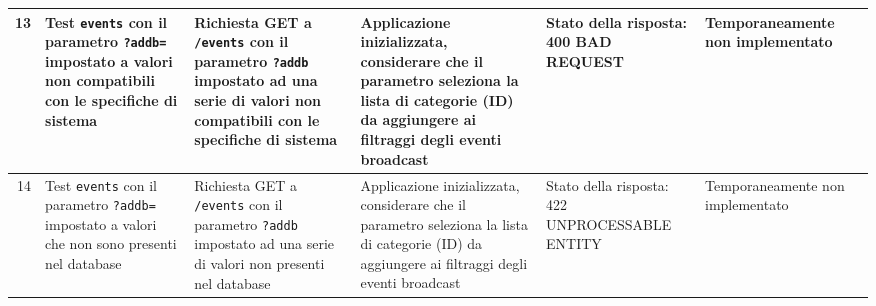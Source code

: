 \documentclass{article}
\begin{document}
\begin{table}[H]
\begin{tabularx}{\textwidth}{| r | X | X | X | X | X | X |}
        \hline
        13 & Test \texttt{events} con il parametro \texttt{?addb=} impostato a valori non compatibili con le specifiche di sistema & Richiesta GET a \texttt{/events} con il parametro \texttt{?addb} impostato ad una serie di valori non compatibili con le specifiche di sistema & Applicazione inizializzata, considerare che il parametro seleziona la lista di categorie (ID) da aggiungere ai filtraggi degli eventi broadcast & Stato della risposta: 400 BAD REQUEST & Temporaneamente non implementato \\
        \hline
        14 & Test \texttt{events} con il parametro \texttt{?addb=} impostato a valori che non sono presenti nel database & Richiesta GET a \texttt{/events} con il parametro \texttt{?addb} impostato ad una serie di valori non presenti nel database & Applicazione inizializzata, considerare che il parametro seleziona la lista di categorie (ID) da aggiungere ai filtraggi degli eventi broadcast & Stato della risposta: 422 UNPROCESSABLE ENTITY & Temporaneamente non implementato \\
        \hline
    \end{tabularx}
\end{table}     
        
\clearpage
        
\end{document}
